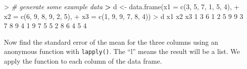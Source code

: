 \documentclass[
]{book}
\newenvironment{Shaded}{\begin{snugshade}}{\end{snugshade}}
\newcommand{\AttributeTok}[1]{\textcolor[rgb]{0.77,0.63,0.00}{#1}}
\newcommand{\CommentTok}[1]{\textcolor[rgb]{0.56,0.35,0.01}{\textit{#1}}}
\newcommand{\ControlFlowTok}[1]{\textcolor[rgb]{0.13,0.29,0.53}{\textbf{#1}}}
\newcommand{\DecValTok}[1]{\textcolor[rgb]{0.00,0.00,0.81}{#1}}
\newcommand{\ErrorTok}[1]{\textcolor[rgb]{0.64,0.00,0.00}{\textbf{#1}}}
\newcommand{\FloatTok}[1]{\textcolor[rgb]{0.00,0.00,0.81}{#1}}
\newcommand{\FunctionTok}[1]{\textcolor[rgb]{0.00,0.00,0.00}{#1}}
\newcommand{\NormalTok}[1]{#1}
\newcommand{\OtherTok}[1]{\textcolor[rgb]{0.56,0.35,0.01}{#1}}
\newcommand{\SpecialCharTok}[1]{\textcolor[rgb]{0.00,0.00,0.00}{#1}}
\begin{document}
\begin{Shaded}
\begin{Highlighting}[]
\SpecialCharTok{\textgreater{}} \CommentTok{\# generate some example data}
\ErrorTok{\textgreater{}}\NormalTok{ d }\OtherTok{\textless{}{-}} \FunctionTok{data.frame}\NormalTok{(}\AttributeTok{x1 =} \FunctionTok{c}\NormalTok{(}\DecValTok{3}\NormalTok{, }\DecValTok{5}\NormalTok{, }\DecValTok{7}\NormalTok{, }\DecValTok{1}\NormalTok{, }\DecValTok{5}\NormalTok{, }\DecValTok{4}\NormalTok{),}
\SpecialCharTok{+}                 \AttributeTok{x2 =} \FunctionTok{c}\NormalTok{(}\DecValTok{6}\NormalTok{, }\DecValTok{9}\NormalTok{, }\DecValTok{8}\NormalTok{, }\DecValTok{9}\NormalTok{, }\DecValTok{2}\NormalTok{, }\DecValTok{5}\NormalTok{),}
\SpecialCharTok{+}                 \AttributeTok{x3 =} \FunctionTok{c}\NormalTok{(}\DecValTok{1}\NormalTok{, }\DecValTok{9}\NormalTok{, }\DecValTok{9}\NormalTok{, }\DecValTok{7}\NormalTok{, }\DecValTok{8}\NormalTok{, }\DecValTok{4}\NormalTok{))}
\SpecialCharTok{\textgreater{}}\NormalTok{ d}
\NormalTok{  x1 x2 x3}
\DecValTok{1}  \DecValTok{3}  \DecValTok{6}  \DecValTok{1}
\DecValTok{2}  \DecValTok{5}  \DecValTok{9}  \DecValTok{9}
\DecValTok{3}  \DecValTok{7}  \DecValTok{8}  \DecValTok{9}
\DecValTok{4}  \DecValTok{1}  \DecValTok{9}  \DecValTok{7}
\DecValTok{5}  \DecValTok{5}  \DecValTok{2}  \DecValTok{8}
\DecValTok{6}  \DecValTok{4}  \DecValTok{5}  \DecValTok{4}
\end{Highlighting}
\end{Shaded}

Now find the standard error of the mean for the three columns using an anonymous function with \texttt{lapply()}. The ``l'' means the result will be a list. We apply the function to each column of the data frame.

\begin{Shaded}
\end{Shaded}
\end{document}
